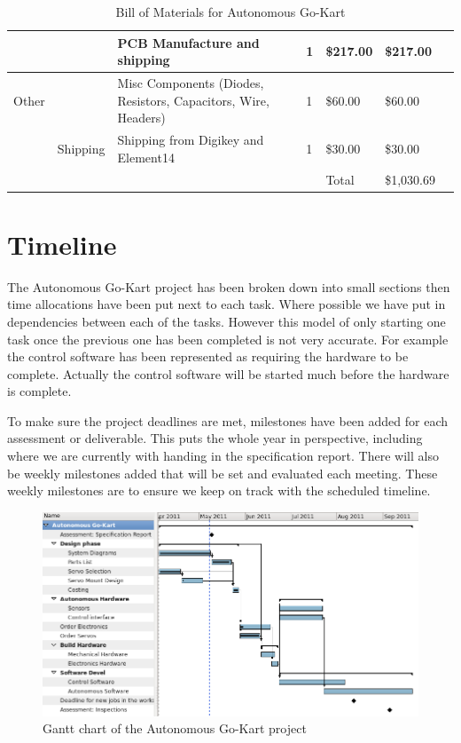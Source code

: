 \begin{table}[h]
\begin{center}
\begin{tabular}{ | l | l | p{} | l | l | l | l | }
      &  & PCB Manufacture and shipping & 1 & \$217.00 & \$217.00 \\
      \hline
      Other &  & Misc Components (Diodes, Resistors, Capacitors, Wire, Headers) & 1 & \$60.00 & \$60.00 \\
      & Shipping & Shipping from Digikey and Element14 & 1 & \$30.00 & \$30.00 \\
      \hline
      &  &  &  & Total & \$1,030.69 \\
      \hline
    \end{tabular}
  \end{center}
  \caption{Bill of Materials for Autonomous Go-Kart}
\end{table}



\section{Timeline}
The Autonomous Go-Kart project has been broken down into small sections then
time allocations have been put next to each task. Where possible we have put in
dependencies between each of the tasks. However this model of only starting one
task once the previous one has been completed is not very accurate. For example
the control software has been represented as requiring the hardware to be
complete. Actually the control software will be started much before the hardware
is complete.

To make sure the project deadlines are met, milestones have been added for each
assessment or deliverable. This puts the whole year in perspective, including
where we are currently with handing in the specification report. There will also
be weekly milestones added that will be set and evaluated each meeting. These
weekly milestones are to ensure we keep on track with the scheduled timeline.

  \begin{figure}[h]
    \centering
    \includegraphics[width=1.0\textwidth]{Images/Gantt.png}
    \caption{Gantt chart of the Autonomous Go-Kart project}
    \label{gantt_chart}
  \end{figure}

